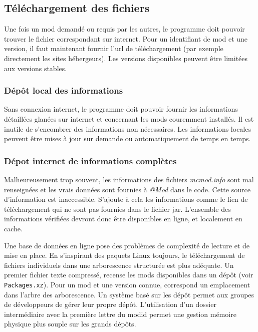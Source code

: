\documentclass{article}
\begin{document}
\subsection{Téléchargement des fichiers}
Une fois un mod demandé ou requis par les autres, le programme doit pouvoir trouver le fichier correspondant sur internet.
Pour un identifiant de mod et une version, il faut maintenant fournir l'url de téléchargement (par exemple directement les sites hébergeurs).
Les versions disponibles peuvent être limitées aux versions stables.

\subsubsection{Dépôt local des informations}
\label{section:depot_local}
Sans connexion internet, le programme doit pouvoir fournir les informations détaillées glanées sur internet et concernant les mods couremment installés.
Il est inutile de s'encombrer des informations non nécessaires.
Les informations locales peuvent être mises à jour sur demande ou automatiquement de temps en temps.

\subsubsection{Dépot internet de informations complètes}
Malheureusement trop souvent, les informations des fichiers \textit{mcmod.info} sont mal renseignées et les vrais données sont fournies à \textit{@Mod} dans le code.
Cette source d'information est inaccessible.
S'ajoute à cela les informations comme le lien de téléchargement qui ne sont pas fournies dans le fichier jar.
L'ensemble des informations vérifiées devront donc être disponibles en ligne, et localement en cache.

Une base de données en ligne pose des problèmes de complexité de lecture et de mise en place.
En s'inspirant des paquets Linux toujours, le téléchargement de fichiers individuels dans une arborescence structurée est plus adéquate.
Un premier fichier texte compressé, recense les mods disponibles dans un dépôt (voir \texttt{Packages.xz}).
Pour un mod et une version connue, correspond un emplacement dans l'arbre des arborescence.
Un système basé sur les dépôt permet aux groupes de développeurs de gérer leur propre dépôt.
L'utilisation d'un dossier intermédiaire avec la première lettre du modid permet une gestion mémoire physique plus souple sur les grands dépôts.

\end{document}

